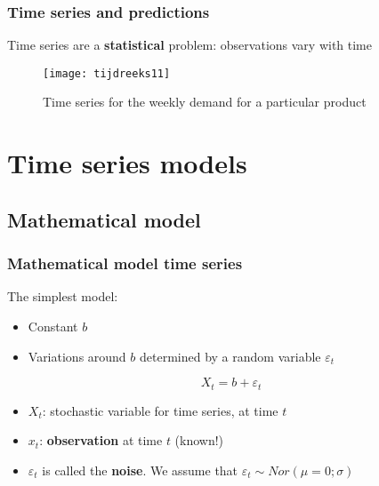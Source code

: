 \documentclass[aspectratio=169]{beamer}
\begin{document}
\begin{frame}[plain]
  \frametitle{Time series and predictions}
  
  Time series are a \textbf{statistical} problem: observations vary with time
  
  \begin{figure}
    \centering
    \texttt{[image: tijdreeks11]}
    \caption{Time series for the weekly demand for a particular product}
  \end{figure}
\end{frame}

\section{Time series models}

\subsection{Mathematical model}

\begin{frame}
  \frametitle{Mathematical model time series}
  
  The simplest model:
  
  \begin{itemize}
    \item Constant $b$
    \item Variations around $b$ determined by a random variable $\varepsilon_{t}$
  \end{itemize}
  
  \begin{equation}
  X_{t} = b + \varepsilon_{t}
  \label{eq:time-series-constant}
  \end{equation}
  
  \begin{itemize}
    \item $X_{t}$: stochastic variable for time series, at time $t$
    \item $x_{t}$: \textbf{observation} at time $t$ (known!)
    \item $\varepsilon_{t}$ is called the \textbf{noise}. We assume that $\varepsilon_{t} \sim Nor(\mu = 0; \sigma)$
  \end{itemize}
\end{frame}
\end{document}
